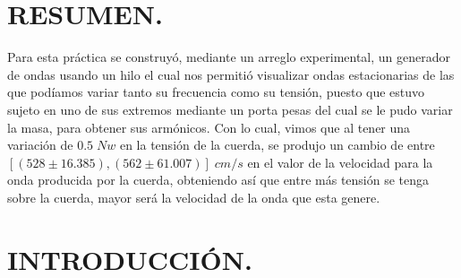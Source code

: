 \documentclass[10pt,a4paper]{article}
\begin{document}
\portada

\section{RESUMEN.} %
Para esta práctica se construyó, mediante un arreglo experimental, un generador de ondas usando un hilo el cual nos permitió visualizar ondas estacionarias de las que podíamos variar tanto su frecuencia como su tensión, puesto que estuvo sujeto en uno de sus extremos mediante un porta pesas del cual se le pudo variar la masa, para obtener sus armónicos. Con lo cual, vimos que al tener una variación de $0.5\;Nw$ en la tensión de la cuerda, se produjo un cambio de entre \([(528 \pm 16.385), (562\pm 61.007)]\;cm/s\) en el valor de la velocidad para la onda producida por la cuerda, obteniendo así que entre más tensión se tenga sobre la cuerda, mayor será la velocidad de la onda que esta genere.

\section{INTRODUCCIÓN.} %
\end{document}
